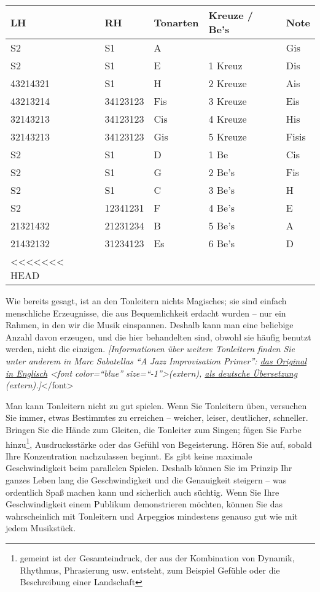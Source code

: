 \begin{tabular}{l|l|l|l|l}
 LH & RH & Tonarten & Kreuze / Be's & Note \\ 
 \hline
 S2 & S1 & A &   & Gis \\ 
 S2 & S1 & E & 1 Kreuz & Dis \\ 
 43214321 & S1 & H & 2 Kreuze & Ais \\ 
 43213214 & 34123123 & Fis & 3 Kreuze & Eis \\ 
 32143213 & 34123123 & Cis & 4 Kreuze & His \\ 
 32143213 & 34123123 & Gis & 5 Kreuze & Fisis \\ 
 S2 & S1 & D & 1 Be & Cis \\ 
 S2 & S1 & G & 2 Be's & Fis \\ 
 S2 & S1 & C & 3 Be's & H \\ 
 S2 & 12341231 & F & 4 Be's & E \\ 
 21321432 & 21231234 & B & 5 Be's & A \\ 
 21432132 & 31234123 & Es & 6 Be's & D \\ 
<<<<<<< HEAD
\end{tabular}

Wie bereits gesagt, ist an den Tonleitern nichts Magisches; sie sind einfach menschliche Erzeugnisse, die aus Bequemlichkeit erdacht wurden -- nur ein Rahmen, in den wir die Musik einspannen.
Deshalb kann man eine beliebige Anzahl davon erzeugen, und die hier behandelten sind, obwohl sie häufig benutzt werden, nicht die einzigen.
\textit{[Informationen über weitere Tonleitern finden Sie unter anderem in Marc Sabatellas \enquote{A Jazz Improvisation Primer}: \hyperref[http://www.outsideshore.com/primer/primer/index.html]{das Original in Englisch} <font color=\enquote{blue} size=\enquote{-1}>(extern), \hyperref[http://msjipde.uteedgar-lins.de/index.html]{als deutsche Übersetzung} (extern).]}</font>

Man kann Tonleitern nicht zu gut spielen.
Wenn Sie Tonleitern üben, versuchen Sie immer, etwas Bestimmtes zu erreichen -- weicher, leiser, deutlicher, schneller.
Bringen Sie die Hände zum Gleiten, die Tonleiter zum Singen; fügen Sie Farbe hinzu\footnote{gemeint ist der Gesamteindruck, der aus der Kombination von Dynamik, Rhythmus, Phrasierung usw. entsteht, zum Beispiel Gefühle oder die Beschreibung einer Landschaft}, Ausdrucksstärke oder das Gefühl von  Begeisterung.
Hören Sie auf, sobald Ihre Konzentration nachzulassen beginnt.
Es gibt keine maximale Geschwindigkeit beim parallelen Spielen.
Deshalb können Sie im Prinzip Ihr ganzes Leben lang die Geschwindigkeit und die Genauigkeit steigern -- was ordentlich Spaß machen kann und sicherlich auch süchtig.
Wenn Sie Ihre Geschwindigkeit einem Publikum demonstrieren möchten, können Sie das wahrscheinlich mit Tonleitern und Arpeggios mindestens genauso gut wie mit jedem Musikstück.




